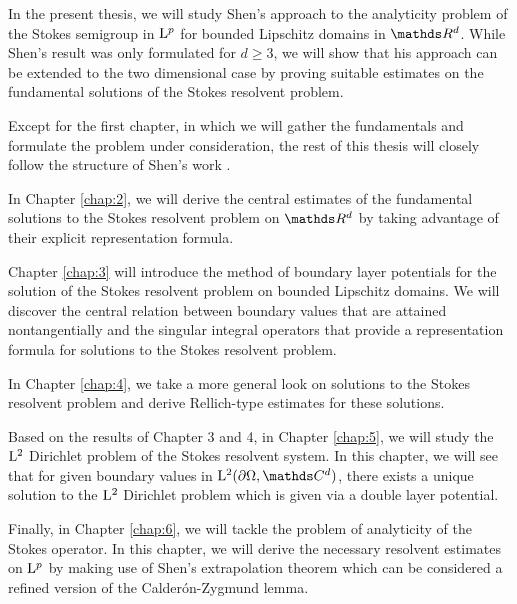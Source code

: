 In the present thesis, we will study Shen's approach to the analyticity problem of the Stokes semigroup in $\mathrm{L}^p$ for bounded Lipschitz domains in $\R^d$.
While Shen's result was only formulated for $d \geq 3$, we will show that his approach can be extended to the two dimensional case by proving suitable estimates on the fundamental solutions of the Stokes resolvent problem.

Except for the first chapter, in which we will gather the fundamentals and formulate the problem under consideration, the rest of this thesis will closely follow the structure of Shen's work \cite{Shen2012}. 

In Chapter \ref{chap:2}, we will derive the central estimates of the fundamental solutions to the Stokes resolvent problem on $\R^d$ by taking advantage of their explicit representation formula.

Chapter \ref{chap:3} will introduce the method of boundary layer potentials for the solution of the Stokes resolvent problem on bounded Lipschitz domains.
We will discover the central relation between boundary values that are attained nontangentially and the singular integral operators that provide a representation formula for solutions to the Stokes resolvent problem. 

In Chapter \ref{chap:4}, we take a more general look on solutions to the Stokes resolvent problem and derive Rellich-type estimates for these solutions.

Based on the results of Chapter 3 and 4, in Chapter \ref{chap:5}, we will study the $\mathrm{L}^2$ Dirichlet problem of the Stokes resolvent system. In this chapter, we will see that for given boundary values in $\Ell^2(\partial\Omega, \C^d)$, there exists a unique solution to the $\mathrm{L}^2$ Dirichlet problem which is given via a double layer potential.

Finally, in Chapter \ref{chap:6}, we will tackle the problem of analyticity of the Stokes operator. In this chapter, we will derive the necessary resolvent estimates on $\mathrm{L}^p$ by making use of Shen's extrapolation theorem which can be considered a refined version of the Calder\'on-Zygmund lemma.



